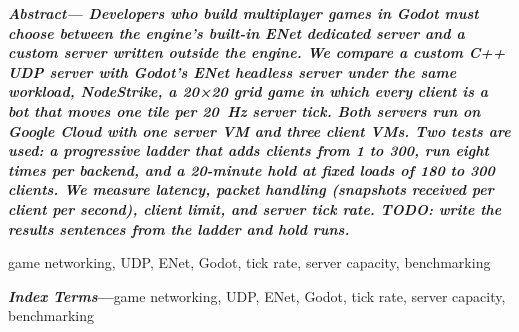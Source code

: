\IfFileExists{IEEEtran.cls}{\ieeetrue\documentclass[conference]{IEEEtran}}{\ieeefalse\documentclass[twocolumn,10pt]{article}}
\renewenvironment{abstract}{\par\noindent\small\bfseries\itshape Abstract---\upshape}{\par\vspace{6pt}}
\begin{document}
\begin{abstract}
Developers who build multiplayer games in Godot must choose between the engine's built-in
ENet dedicated server and a custom server written outside the engine. We compare a custom C++ UDP
server with Godot's ENet headless server under the same workload, NodeStrike, a 20×20 grid game
in which every client is a bot that moves one tile per 20~Hz server tick. Both servers run on
Google Cloud with one server VM and three client VMs. Two tests are used: a progressive
ladder that adds clients from 1 to 300, run eight times per backend, and a 20-minute hold at fixed loads of 180 to 300
clients. We measure latency, packet handling (snapshots received per client per second), client limit, and server
tick rate. TODO: write the results sentences from the ladder and hold runs.
\end{abstract}
\ifieee\begin{IEEEkeywords}
game networking, UDP, ENet, Godot, tick rate, server capacity, benchmarking
\end{IEEEkeywords}\else\par\noindent\small\textbf{\textit{Index Terms}---}game networking, UDP, ENet, Godot, tick rate, server capacity, benchmarking\par\fi
\end{document}
